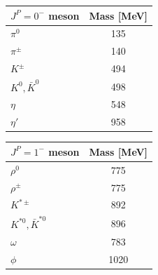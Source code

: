 \begin{center}
  \begin{tabular}{l|c}
   $J^P = 0^-$ meson & Mass [MeV]\\ \hline
   $\pi^0$ & 135 \\
   $\pi^\pm$ & 140 \\
   $K^\pm$ & 494 \\
   $K^0,\bar K^0$ & 498 \\
   $\eta$ & 548 \\
   $\eta'$ & 958 \\
  \end{tabular}\quad
  \begin{tabular}{l|c}
   $J^P = 1^-$ meson & Mass [MeV]\\ \hline
   $\rho^0$ & 775 \\
   $\rho^\pm$ & 775 \\
   $K^{*\pm}$ & 892 \\
   $K^{*0},\bar K^{*0}$ & 896 \\
   $\omega$ & 783 \\
   $\phi$ & 1020 \\
  \end{tabular}
\end{center}  

